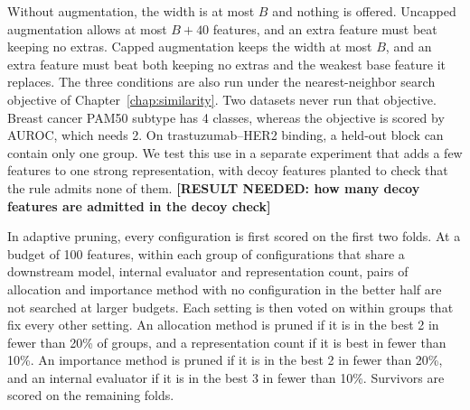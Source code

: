Without augmentation, the width is at most $B$ and nothing is offered. Uncapped augmentation allows at most $B + 40$ features, and an extra feature must beat keeping no extras. Capped augmentation keeps the width at most $B$, and an extra feature must beat both keeping no extras and the weakest base feature it replaces.
The three conditions are also run under the nearest-neighbor search objective of Chapter~\ref{chap:similarity}. Two datasets never run that objective. Breast cancer PAM50 subtype has 4 classes, whereas the objective is scored by AUROC, which needs 2. On trastuzumab--HER2 binding, a held-out block can contain only one group.
We test this use in a separate experiment that adds a few features to one strong representation, with decoy features planted to check that the rule admits none of them. \textbf{[RESULT NEEDED: how many decoy features are admitted in the decoy check]}

In adaptive pruning, every configuration is first scored on the first two folds. At a budget of 100 features, within each group of configurations that share a downstream model, internal evaluator and representation count, pairs of allocation and importance method with no configuration in the better half are not searched at larger budgets. Each setting is then voted on within groups that fix every other setting. An allocation method is pruned if it is in the best 2 in fewer than 20\% of groups, and a representation count if it is best in fewer than 10\%. An importance method is pruned if it is in the best 2 in fewer than 20\%, and an internal evaluator if it is in the best 3 in fewer than 10\%. Survivors are scored on the remaining folds.

